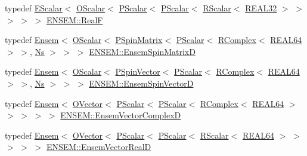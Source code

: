 \begin{DoxyCompactItemize}
\item 
typedef \mbox{\hyperlink{classENSEM_1_1EScalar}{E\+Scalar}}$<$ \mbox{\hyperlink{classENSEM_1_1OScalar}{O\+Scalar}}$<$ \mbox{\hyperlink{classENSEM_1_1PScalar}{P\+Scalar}}$<$ \mbox{\hyperlink{classENSEM_1_1PScalar}{P\+Scalar}}$<$ \mbox{\hyperlink{classENSEM_1_1RScalar}{R\+Scalar}}$<$ \mbox{\hyperlink{namespaceENSEM_a7540d01191172323e9073283d772576d}{R\+E\+A\+L32}} $>$ $>$ $>$ $>$ $>$ \mbox{\hyperlink{group__defs_gaaff7cc896fceee5b1ea6ba88497469ab}{E\+N\+S\+E\+M\+::\+RealF}}
\item 
typedef \mbox{\hyperlink{classENSEM_1_1Ensem}{Ensem}}$<$ \mbox{\hyperlink{classENSEM_1_1OScalar}{O\+Scalar}}$<$ \mbox{\hyperlink{classENSEM_1_1PSpinMatrix}{P\+Spin\+Matrix}}$<$ \mbox{\hyperlink{classENSEM_1_1PScalar}{P\+Scalar}}$<$ \mbox{\hyperlink{classENSEM_1_1RComplex}{R\+Complex}}$<$ \mbox{\hyperlink{namespaceENSEM_a85b215b9f1f43715aebee01718e25082}{R\+E\+A\+L64}} $>$ $>$, \mbox{\hyperlink{namespaceENSEM_a6f05e048f9b2eb1a19131074f8abc25f}{Ns}} $>$ $>$ $>$ \mbox{\hyperlink{group__defs_ga06a2bf065fb18ba1aa1217fc56b85e94}{E\+N\+S\+E\+M\+::\+Ensem\+Spin\+MatrixD}}
\item 
typedef \mbox{\hyperlink{classENSEM_1_1Ensem}{Ensem}}$<$ \mbox{\hyperlink{classENSEM_1_1OScalar}{O\+Scalar}}$<$ \mbox{\hyperlink{classENSEM_1_1PSpinVector}{P\+Spin\+Vector}}$<$ \mbox{\hyperlink{classENSEM_1_1PScalar}{P\+Scalar}}$<$ \mbox{\hyperlink{classENSEM_1_1RComplex}{R\+Complex}}$<$ \mbox{\hyperlink{namespaceENSEM_a85b215b9f1f43715aebee01718e25082}{R\+E\+A\+L64}} $>$ $>$, \mbox{\hyperlink{namespaceENSEM_a6f05e048f9b2eb1a19131074f8abc25f}{Ns}} $>$ $>$ $>$ \mbox{\hyperlink{group__defs_gae8a1e894c16ec6be00388813ab08115c}{E\+N\+S\+E\+M\+::\+Ensem\+Spin\+VectorD}}
\item 
typedef \mbox{\hyperlink{classENSEM_1_1Ensem}{Ensem}}$<$ \mbox{\hyperlink{classENSEM_1_1OVector}{O\+Vector}}$<$ \mbox{\hyperlink{classENSEM_1_1PScalar}{P\+Scalar}}$<$ \mbox{\hyperlink{classENSEM_1_1PScalar}{P\+Scalar}}$<$ \mbox{\hyperlink{classENSEM_1_1RComplex}{R\+Complex}}$<$ \mbox{\hyperlink{namespaceENSEM_a85b215b9f1f43715aebee01718e25082}{R\+E\+A\+L64}} $>$ $>$ $>$ $>$ $>$ \mbox{\hyperlink{group__defs_gaaee70d31501194625b4827518c28934c}{E\+N\+S\+E\+M\+::\+Ensem\+Vector\+ComplexD}}
\item 
typedef \mbox{\hyperlink{classENSEM_1_1Ensem}{Ensem}}$<$ \mbox{\hyperlink{classENSEM_1_1OVector}{O\+Vector}}$<$ \mbox{\hyperlink{classENSEM_1_1PScalar}{P\+Scalar}}$<$ \mbox{\hyperlink{classENSEM_1_1PScalar}{P\+Scalar}}$<$ \mbox{\hyperlink{classENSEM_1_1RScalar}{R\+Scalar}}$<$ \mbox{\hyperlink{namespaceENSEM_a85b215b9f1f43715aebee01718e25082}{R\+E\+A\+L64}} $>$ $>$ $>$ $>$ $>$ \mbox{\hyperlink{group__defs_ga7e294215cc7d7c343921ba1aef53d4dd}{E\+N\+S\+E\+M\+::\+Ensem\+Vector\+RealD}}

\end{DoxyCompactItemize}

